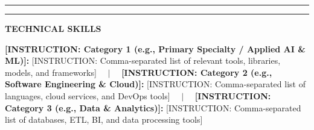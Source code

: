 \documentclass[10pt,a4paper]{article}
\newcommand{\sectionline}{%
  \vspace{4pt}%
  \noindent%
  \begin{minipage}[b]{3.5cm}%
    \color{bannerblue}\rule{\linewidth}{4.5pt}%
  \end{minipage}%
  \hspace{0.3cm}%
  \begin{minipage}[b]{\dimexpr\textwidth-3.8cm\relax}%
    \color{dividerblue}\rule{\linewidth}{1.2pt}%
  \end{minipage}%
  \par \vspace{4pt}%
}
\newcommand{\cvblock}[2]{%
  \vspace{2pt}%
  \noindent%
  \begin{minipage}[t]{3.5cm}%
    \raggedright \bfseries \small \color{textdark} #1%
  \end{minipage}%
  \hspace{0.3cm}%
  \begin{minipage}[t]{\dimexpr\textwidth-3.8cm\relax}%
    \small \color{textdark} #2%
  \end{minipage}%
  \par \vspace{3pt}%
}
\begin{document}
\sectionline
\cvblock{TECHNICAL SKILLS}{%
  \textbf{[INSTRUCTION: Category 1 (e.g., Primary Specialty / Applied AI \& ML)]:} [INSTRUCTION: Comma-separated list of relevant tools, libraries, models, and frameworks] \ \ $|$ \ \ \textbf{[INSTRUCTION: Category 2 (e.g., Software Engineering \& Cloud)]:} [INSTRUCTION: Comma-separated list of languages, cloud services, and DevOps tools] \ \ $|$ \ \ \textbf{[INSTRUCTION: Category 3 (e.g., Data \& Analytics)]:} [INSTRUCTION: Comma-separated list of databases, ETL, BI, and data processing tools]
}
\end{document}
